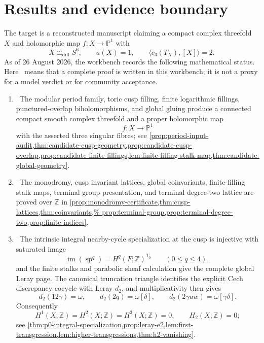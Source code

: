 \section{Results and evidence boundary}

The target is a reconstructed manuscript claiming a compact complex
threefold \(X\) and holomorphic map \(f:X\to\mathbb P^1\) with
\[
X\cong_{\mathrm{diff}}S^6,\qquad a(X)=1,\qquad
\langle c_3(T_X),[X]\rangle=2.
\]
As of 26 August 2026, the workbench records the following mathematical
status.  Here \Verified\ means that a complete proof is written in this
workbench; it is not a proxy for a model verdict or for community acceptance.

\begin{enumerate}[leftmargin=1.8em]
\item \Verified\ The modular period family, toric cusp filling, finite
logarithmic fillings, punctured-overlap biholomorphisms, and global gluing
produce a connected compact smooth complex threefold and a proper
holomorphic map
\[
 f:X\longrightarrow\mathbb P^1
\]
with the asserted three singular fibres; see
\cref{prop:period-input-audit,thm:candidate-cusp-geometry,prop:candidate-cusp-overlap,prop:candidate-finite-fillings,lem:finite-filling-stalk-map,thm:candidate-global-geometry}.

\item \Verified\ The monodromy, cusp invariant lattices, global
coinvariants, finite-filling stalk maps, terminal group presentation, and
terminal degree-two lattice are proved over \(\mathbb Z\) in
\cref{prop:monodromy-certificate,thm:cusp-lattices,thm:coinvariants,%
prop:terminal-group,prop:terminal-degree-two,prop:finite-indices}.

\item \Verified\ The intrinsic integral nearby-cycle specialization at the
cusp is injective with saturated image
\[
 \operatorname{im}(\operatorname{sp}^q)
   =H^q(F;\mathbb Z)^{T_0}\qquad(0\le q\le4),
\]
and the finite stalks and parabolic sheaf calculation give the complete
global Leray page.  The canonical truncation triangle identifies the
explicit Cech discrepancy cocycle with Leray \(d_2\), and multiplicativity
then gives
\[
 d_2(12\gamma)=\omega,\qquad
 d_2(2q)=\omega[\delta],\qquad
 d_2(2\gamma uw)=\omega[\gamma\delta].
\]
Consequently
\[
 H^1(X;\mathbb Z)=H^2(X;\mathbb Z)=H^3(X;\mathbb Z)=0,
 \qquad H_2(X;\mathbb Z)=0;
\]
see
\cref{thm:p0-integral-specialization,prop:leray-e2,lem:first-transgression,lem:higher-transgressions,thm:h2-vanishing}.


\end{enumerate}
